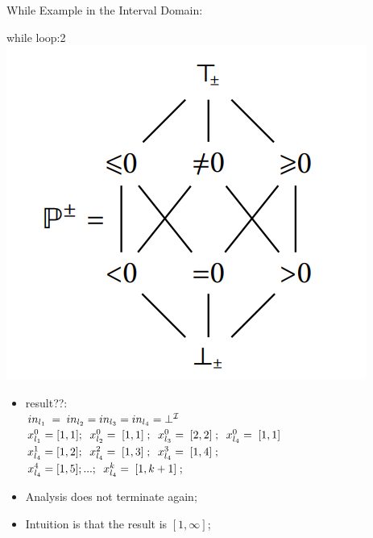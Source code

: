 \begin{frame}{While Example in the Interval Domain:}
\begin{exampleblock}{while loop:2}
	\centering 
	\centering \includegraphics[scale=0.60]{content/images/static-analysis/sign1.png}
	
	\begin{itemize}
		\item result??: 
		\\ $\scriptsize in_{l_1}~=~in_{l_2}=in_{l_3}=in_{l_4}=\bot^{\mathcal{I}}$
		\\ $\scriptsize x_{l_1}^0 = [1,1] ;~~x_{l_2}^0 =~[1,1]~;~~x_{l_3}^0 =~[2,2]~;~~x_{l_4}^0 =~[1,1]$\\
		 $\scriptsize x_{l_4}^1 = [1,2] ;~~x_{l_4}^2 =~[1,3]~;~~x_{l_4}^3 =~[1,4]~;$
		\\ $\scriptsize x_{l_4}^4= [1,5] ;...;~~x_{l_4}^k =~[1,k+1]~;$
		\item Analysis does not terminate again;
		\item Intuition is that the result is $[1,\infty]$;
	\end{itemize}
\end{exampleblock}
\end{frame}


